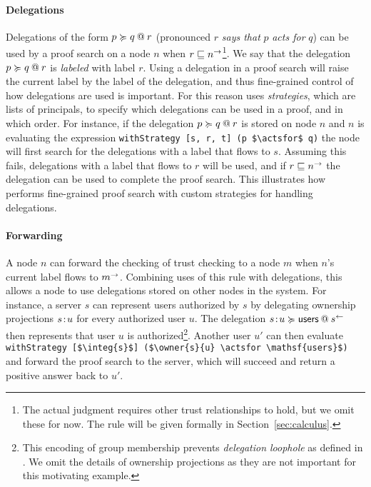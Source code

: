 \paragraph{Delegations}
Delegations of the form $\lb{r}{p \actsfor q}$ (pronounced $r$ \emph{says that} $p$ \emph{acts for} $q$) can be used by a proof search on a node $n$ when $r \flowsto \conf{n}$\footnote{The actual judgment requires other trust relationships to hold, but we omit these for now. The rule will be given formally in Section~\ref{sec:calculus}.}. We say that the delegation $\lb{r}{p \actsfor q}$ is \emph{labeled} with label $r$. Using a delegation in a proof search will raise the current label by the label of the delegation, and thus fine-grained control of how delegations are used is important. For this reason \lang{} uses \emph{strategies}, which are lists of principals, to specify which delegations can be used in a proof, and in which order. For instance, if the delegation $\lb{r}{p \actsfor q}$ is stored on node $n$ and $n$ is evaluating the expression \lstinline[mathescape]!withStrategy [s, r, t] (p $\actsfor$ q)! the node will first search for the delegations with a label that flows to $s$. Assuming this fails, delegations with a label that flows to $r$ will be used, and if $r \flowsto \conf{n}$ the delegation can be used to complete the proof search. This illustrates how \lang{} performs fine-grained proof search with custom strategies for handling delegations.

\paragraph{Forwarding}
A node $n$ can forward the checking of trust checking to a node $m$ when $n$'s current label flows to $\conf{m}$. Combining uses of this rule with delegations, this allows a node to use delegations stored on other nodes in the system. For instance, a server $s$ can represent users authorized by $s$ by delegating ownership projections $\owner{s}{u}$ for every authorized user $u$. The delegation $\lb{\integ{s}}{\owner{s}{u} \actsfor \mathsf{users}}$ then represents that user $u$ is authorized\footnote{This encoding of group membership prevents \emph{delegation loophole} as defined in \cite{Arden:2015:FA:2859845.2859998}. We omit the details of ownership projections as they are not important for this motivating example.}. Another user $u'$ can then evaluate \lstinline[mathescape]!withStrategy [$\integ{s}$] ($\owner{s}{u} \actsfor \mathsf{users}$)! and forward the proof search to the server, which will succeed and return a positive answer back to $u'$.